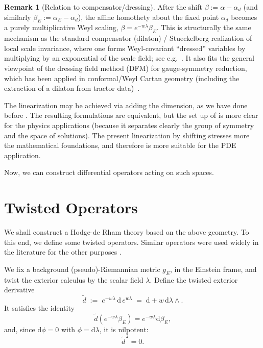 \documentclass[preprint,12pt]{elsarticle}
\theoremstyle{plain}
\theoremstyle{definition}
\newtheorem{remark}[theorem]{Remark}
\theoremstyle{note}
\newcommand{\dd}{\mathrm{d}}
\newcommand{\wtd}{\tilde d}
\begin{document}
\begin{remark}[Relation to compensator/dressing]
After the shift $\beta:=\alpha-\alpha_d$ (and similarly $\beta_E:=\alpha_E-\alpha_d$), the affine homothety about the fixed point  $\alpha_d$ becomes a purely multiplicative Weyl scaling, $\beta=e^{-w\lambda}\beta_E$. This is structurally the same mechanism as the standard compensator (dilaton) / Stueckelberg realization of local scale invariance, where one forms Weyl-covariant ``dressed'' variables by multiplying by an exponential of the scale field; see e.g.~\cite{Ghilencea2020WeylStueckelberg}. It also fits the general viewpoint of the dressing field method (DFM) for gauge-symmetry reduction, which has been applied in conformal/Weyl Cartan geometry (including the extraction of a dilaton from tractor data)~\cite{Attard2017DFM,Francois2019DilatonTractor}.
\end{remark}

The linearization may be achieved via adding the dimension, as we have done before \cite{Sabetghadam2025}. The resulting formulations are equivalent, but the set up of  \cite{Sabetghadam2025} is more clear for the physics applications (because it separates clearly the group of symmetry and the space of solutions). The present linearization by shifting stresses more the mathematical foundations, and therefore is more suitable for the PDE application. 

\noindent
Now, we can construct differential operators acting on such spaces.

\section{Twisted Operators} \label{sec:relation-witten}

We shall construct a Hodge-de Rham theory based on the above geometry. To this end, we define some twisted operators. Similar operators were used widely in the literature for the other purposes \cite{Witten1982,Novikov1981,Gover2005}.  

We fix a background (pseudo)-Riemannian metric $g_E$, in the Einstein frame, and twist the exterior calculus by the scalar field $\lambda$.
Define the twisted exterior derivative
\begin{equation}\label{eq:tilde-d}
\wtd \;:=\; e^{-w\lambda}\,\dd\,e^{w\lambda}
\;=\; \dd + w\,\dd\lambda\wedge .
\end{equation}
It satisfies the identity
\begin{equation}\label{eq:intertwine}
\wtd\!\left(e^{-w\lambda}\beta_E\right)=e^{-w\lambda}\dd\beta_E,
\end{equation}
and, since $\dd\phi=0$ with $\phi=\dd\lambda$, it is nilpotent:
\begin{equation}\label{eq:tilde-d-nilp}
\boxed{
\wtd^{\,2}=0.}
\end{equation}
\end{document}
